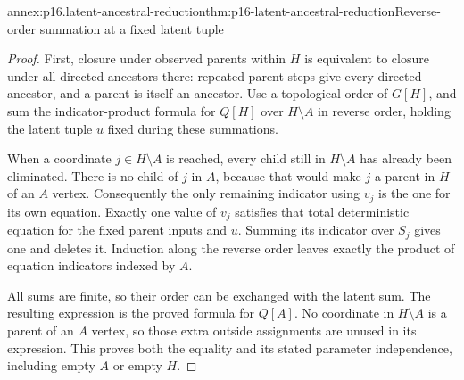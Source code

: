 \begin{annexitem}{annex:p16.latent-ancestral-reduction}{thm:p16-latent-ancestral-reduction}{Reverse-order summation at a fixed latent tuple}
\begin{proof}
First, closure under observed parents within \(H\) is equivalent
to closure under all directed ancestors there: repeated parent steps
give every directed ancestor, and a parent is itself an ancestor.
Use a topological order of \(G[H]\), and sum the indicator-product
formula for \(Q[H]\) over \(H\setminus A\) in reverse order,
holding the latent tuple \(u\) fixed during these summations.

When a coordinate \(j\in H\setminus A\) is reached, every
child still in \(H\setminus A\) has already been eliminated.
There is no child of \(j\) in \(A\), because that would make
\(j\) a parent in \(H\) of an \(A\) vertex. Consequently
the only remaining indicator using \(v_j\) is the one for its
own equation. Exactly one value of \(v_j\) satisfies that total
deterministic equation for the fixed parent inputs and \(u\).
Summing its indicator over \(S_j\) gives one and deletes it.
Induction along the reverse order leaves exactly the product of
equation indicators indexed by \(A\).

All sums are finite, so their order can be exchanged with the latent
sum. The resulting expression is the proved formula for \(Q[A]\).
No coordinate in \(H\setminus A\) is a parent of an \(A\)
vertex, so those extra outside assignments are unused in its
expression. This proves both the equality and its stated parameter
independence, including empty \(A\) or empty \(H\).
\end{proof}
\end{annexitem}

